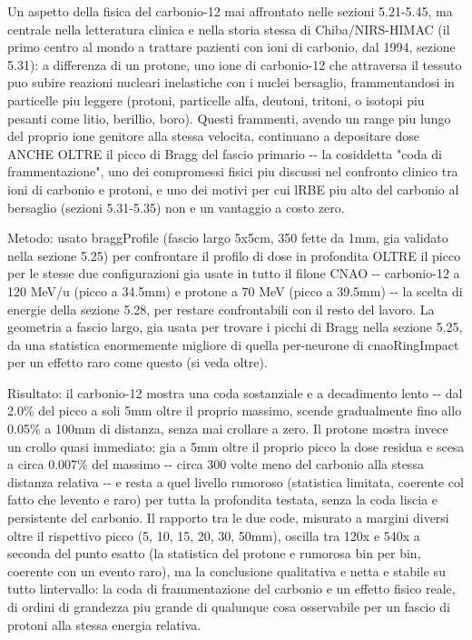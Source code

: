\documentclass[
  italian,
]{article}
\begin{document}
Un aspetto della fisica del carbonio-12 mai affrontato nelle sezioni 5.21-5.45, ma centrale nella letteratura clinica e nella storia stessa di Chiba/NIRS-HIMAC (il primo centro al mondo a trattare pazienti con ioni di carbonio, dal 1994, sezione 5.31): a differenza di un protone, uno ione di carbonio-12 che attraversa il tessuto puo\textquotesingle{} subire reazioni nucleari inelastiche con i nuclei bersaglio, frammentandosi in particelle piu\textquotesingle{} leggere (protoni, particelle alfa, deutoni, tritoni, o isotopi piu\textquotesingle{} pesanti come litio, berillio, boro). Questi frammenti, avendo un range piu\textquotesingle{} lungo del proprio ione genitore alla stessa velocita\textquotesingle, continuano a depositare dose ANCHE OLTRE il picco di Bragg del fascio primario -\/- la cosiddetta "coda di frammentazione", uno dei compromessi fisici piu\textquotesingle{} discussi nel confronto clinico tra ioni di carbonio e protoni, e uno dei motivi per cui l\textquotesingle RBE piu\textquotesingle{} alto del carbonio al bersaglio (sezioni 5.31-5.35) non e\textquotesingle{} un vantaggio a costo zero.

Metodo: usato braggProfile (fascio largo 5x5cm, 350 fette da 1mm, gia\textquotesingle{} validato nella sezione 5.25) per confrontare il profilo di dose in profondita\textquotesingle{} OLTRE il picco per le stesse due configurazioni gia\textquotesingle{} usate in tutto il filone CNAO -\/- carbonio-12 a 120 MeV/u (picco a 34.5mm) e protone a 70 MeV (picco a 39.5mm) -\/- la scelta di energie della sezione 5.28, per restare confrontabili con il resto del lavoro. La geometria a fascio largo, gia\textquotesingle{} usata per trovare i picchi di Bragg nella sezione 5.25, da\textquotesingle{} una statistica enormemente migliore di quella per-neurone di cnaoRingImpact per un effetto raro come questo (si veda oltre).

Risultato: il carbonio-12 mostra una coda sostanziale e a decadimento lento -\/- dal 2.0\% del picco a soli 5mm oltre il proprio massimo, scende gradualmente fino allo 0.05\% a 100mm di distanza, senza mai crollare a zero. Il protone mostra invece un crollo quasi immediato: gia\textquotesingle{} a 5mm oltre il proprio picco la dose residua e\textquotesingle{} scesa a circa 0.007\% del massimo -\/- circa 300 volte meno del carbonio alla stessa distanza relativa -\/- e resta a quel livello rumoroso (statistica limitata, coerente col fatto che l\textquotesingle evento e\textquotesingle{} raro) per tutta la profondita\textquotesingle{} testata, senza la coda liscia e persistente del carbonio. Il rapporto tra le due code, misurato a margini diversi oltre il rispettivo picco (5, 10, 15, 20, 30, 50mm), oscilla tra 120x e 540x a seconda del punto esatto (la statistica del protone e\textquotesingle{} rumorosa bin per bin, coerente con un evento raro), ma la conclusione qualitativa e\textquotesingle{} netta e stabile su tutto l\textquotesingle intervallo: la coda di frammentazione del carbonio e\textquotesingle{} un effetto fisico reale, di ordini di grandezza piu\textquotesingle{} grande di qualunque cosa osservabile per un fascio di protoni alla stessa energia relativa.
\end{document}
